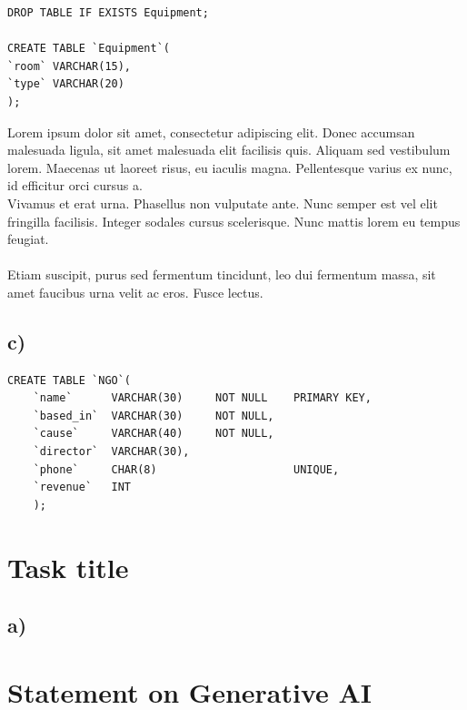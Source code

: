 \documentclass[twoside, a4paper, 11pt]{article}
\begin{document}
\begin{lstlisting}[label=Second]
DROP TABLE IF EXISTS Equipment;

CREATE TABLE `Equipment`(
`room` VARCHAR(15),
`type` VARCHAR(20)
);
\end{lstlisting}
\noindent
Lorem ipsum dolor sit amet, consectetur adipiscing elit. Donec accumsan malesuada ligula, sit amet malesuada elit facilisis quis. Aliquam sed vestibulum lorem. Maecenas ut laoreet risus, eu iaculis magna. Pellentesque varius ex nunc, id efficitur orci cursus a.\\ %
Vivamus et erat urna. Phasellus non vulputate ante. Nunc semper est vel elit fringilla facilisis. Integer sodales cursus scelerisque. Nunc mattis lorem eu tempus feugiat.\\\\ %
Etiam suscipit, purus sed fermentum tincidunt, leo dui fermentum massa, sit amet faucibus urna velit ac eros. Fusce lectus.
\subsection*{c)}

\begin{lstlisting}[label=Third]
	CREATE TABLE `NGO`(
	`name` 		VARCHAR(30) 	NOT NULL	PRIMARY KEY,
	`based_in` 	VARCHAR(30)		NOT NULL,
	`cause` 	VARCHAR(40)		NOT NULL,
	`director` 	VARCHAR(30),
	`phone` 	CHAR(8)						UNIQUE,
	`revenue`	INT
	);
\end{lstlisting}



\section{Task title}
\subsection*{a)}





\newpage
	
\section*{Statement on Generative AI}
\end{document}
